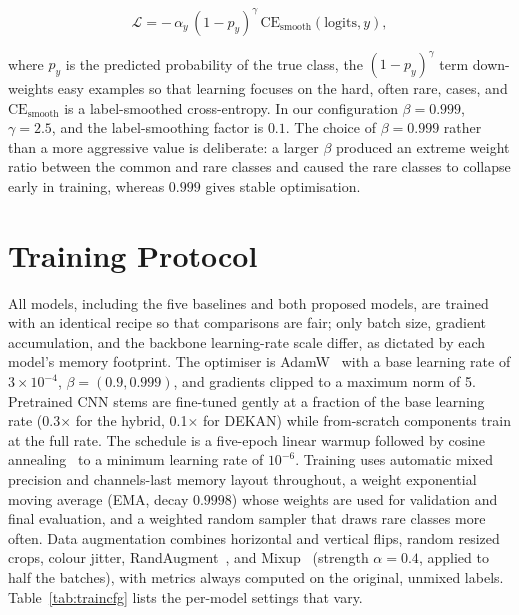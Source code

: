 \begin{equation}
\mathcal{L} = -\,\alpha_y\,(1 - p_y)^{\gamma}\,\mathrm{CE}_{\text{smooth}}(\text{logits}, y),
\end{equation}

where $p_y$ is the predicted probability of the true class, the
$(1-p_y)^{\gamma}$ term down-weights easy examples so that learning focuses on
the hard, often rare, cases, and $\mathrm{CE}_{\text{smooth}}$ is a
label-smoothed cross-entropy. In our configuration $\beta = 0.999$,
$\gamma = 2.5$, and the label-smoothing factor is $0.1$. The choice of
$\beta = 0.999$ rather than a more aggressive value is deliberate: a larger
$\beta$ produced an extreme weight ratio between the common and rare classes and
caused the rare classes to collapse early in training, whereas $0.999$ gives
stable optimisation.

\section{Training Protocol}

All models, including the five baselines and both proposed models, are trained with
an identical recipe so that comparisons are fair; only batch size, gradient
accumulation, and the backbone learning-rate scale differ, as dictated by each
model's memory footprint. The optimiser is AdamW~\cite{loshchilov2019adamw} with
a base learning rate of $3\times10^{-4}$, $\beta=(0.9, 0.999)$, and gradients
clipped to a maximum norm of 5. Pretrained CNN stems are fine-tuned gently at a
fraction of the base learning rate (0.3$\times$ for the hybrid, 0.1$\times$ for
DEKAN) while from-scratch components train at the full rate. The schedule is a
five-epoch linear warmup followed by cosine annealing~\cite{loshchilov2017sgdr}
to a minimum learning rate of $10^{-6}$. Training uses automatic mixed precision
and channels-last memory layout throughout, a weight exponential moving average
(EMA, decay $0.9998$) whose weights are used for validation and final
evaluation, and a weighted random sampler that draws rare classes more often.
Data augmentation combines horizontal and vertical flips, random resized crops,
colour jitter, RandAugment~\cite{cubuk2020randaugment}, and
Mixup~\cite{zhang2018mixup} (strength $\alpha=0.4$, applied to half the batches),
with metrics always computed on the original, unmixed labels. Table~\ref{tab:traincfg}
lists the per-model settings that vary.


